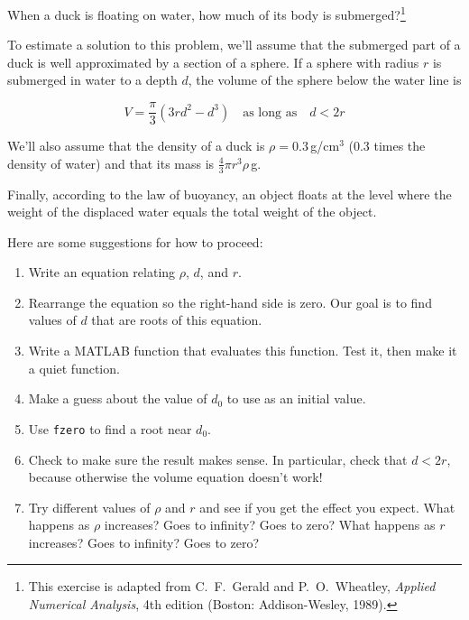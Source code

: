 \documentclass[../../book.tex]{subfiles}
\begin{document}
\begin{ex}
\label{ex:duck}

When a duck is floating on water, how much of its body is submerged?\footnote{This exercise is adapted from C.~F.~Gerald and P.~O.~Wheatley, \emph{Applied Numerical Analysis}, 4th edition (Boston: Addison-Wesley, 1989).}


To estimate a solution to this problem, we'll assume that the submerged part of a duck is well approximated by a section of a sphere.
If a sphere with radius $r$ is submerged in water to a depth $d$, the
volume of the sphere below the water line is

\[ V = \frac{\pi}{3} (3r d^2 - d^3) \quad
\mbox{as long as} \quad d < 2 r  \]

We'll also assume that the density of a duck is $\rho = 0.3$\,g/cm$^3$ (0.3 times the density of water) and that its mass is $\frac{4}{3} \pi r^3 \rho$\,g.

Finally, according to the law of buoyancy, an object floats at the level where the weight of the displaced water equals the total weight of the object.


Here are some suggestions for how to proceed:

\begin{enumerate}

\item Write an equation relating $\rho$, $d$, and $r$.

\item Rearrange the equation so the right-hand side is zero.
Our goal is to find values of $d$ that are roots of this equation.

\item Write a MATLAB function that evaluates this function.  Test it,
   then make it a quiet function.

\item Make a guess about the value of $d_0$ to use as an initial value.

\item Use \lstinline{fzero} to find a root near $d_0$.

\item Check to make sure the result makes sense.  In particular,
   check that $d < 2 r$, because otherwise the volume equation
   doesn't work!

\item Try different values of $\rho$ and $r$ and see if you get the
  effect you expect.  What happens as $\rho$ increases?  Goes to
  infinity?  Goes to zero?  What happens as $r$ increases?  Goes to
  infinity?  Goes to zero?

\end{enumerate}




\end{ex}
\end{document}
